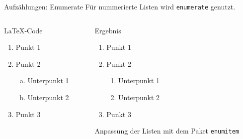 \begin{frame}[fragile]{Aufzählungen: Enumerate}
  Für nummerierte Listen wird \texttt{enumerate} genutzt.
  \begin{columns}[t]
    \begin{column}{0.47\textwidth}
      \begin{block}{\LaTeX-Code}
        \begin{lstverbatim}
        \begin{enumerate}
          \item Punkt 1
          \item Punkt 2
            \begin{enumerate}[(a)]
              \item Unterpunkt 1
              \item Unterpunkt 2
            \end{enumerate}
          \item Punkt 3
        \end{enumerate}
        \end{lstverbatim}
      \end{block}
    \end{column}
    \begin{column}{0.47\textwidth}
      \begin{block}{Ergebnis}
        \begin{enumerate}
          \item Punkt 1
          \item Punkt 2
            \begin{enumerate}
              \item Unterpunkt 1
              \item Unterpunkt 2
            \end{enumerate}
          \item Punkt 3
        \end{enumerate}
      \end{block}
      Anpassung der Listen mit dem Paket \texttt{enumitem}
    \end{column}
  \end{columns}
\end{frame}

